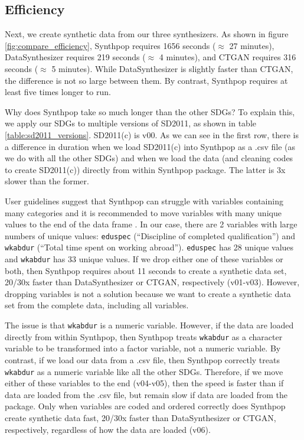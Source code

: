 \documentclass[runningheads]{llncs}
\begin{document}
\subsection{Efficiency}

Next, we create synthetic data from our three synthesizers.  As shown in figure \ref{fig:compare_efficiency}, Synthpop requires 1656 seconds ($\approx$ 27 minutes), DataSynthesizer requires 219 seconds ($\approx$ 4 minutes), and CTGAN requires 316 seconds ($\approx$ 5 minutes).  While DataSynthesizer is slightly faster than CTGAN, the difference is not so large between them.  By contrast, Synthpop requires at least five times longer to run. 

Why does Synthpop take so much longer than the other SDGs?  To explain this, we apply our SDGs to multiple versions of SD2011, as shown in table \ref{table:sd2011_versions}.  SD2011(c) is v00.  As we can see in the first row, there is a difference in duration when we load SD2011(c) into Synthpop as a .csv file (as we do with all the other SDGs) and when we load the data (and cleaning codes to create SD2011(c)) directly from within Synthpop package.  The latter is 3x slower than the former.   

User guidelines suggest that Synthpop can struggle with variables containing many categories and it is recommended to move variables with many unique values to the end of the data frame \cite{raab2017guidelines}.  In our case, there are 2 variables with large numbers of unique values: \texttt{eduspec} (``Discipline of completed qualification'') and \texttt{wkabdur} (``Total time spent on working abroad'').  \texttt{eduspec} has 28 unique values and \texttt{wkabdur} has 33 unique values.  If we drop either one of these variables or both, then Synthpop requires about 11 seconds to create a synthetic data set, 20/30x faster than DataSynthesizer or CTGAN, respectively (v01-v03).  However, dropping variables is not a solution because we want to create a synthetic data set from the complete data, including all variables.   

The issue is that \texttt{wkabdur} is a numeric variable.  However, if the data are loaded directly from within Synthpop, then Synthpop treats \texttt{wkabdur} as a character variable to be transformed into a factor variable, not a numeric variable.  By contrast, if we load our data from a .csv file, then Synthpop correctly treats  \texttt{wkabdur} as a numeric variable like all the other SDGs.  Therefore, if we move either of these variables to the end (v04-v05), then the speed is faster than if data are loaded from the .csv file, but remain slow if data are loaded from the package.  Only when variables are coded and ordered correctly does Synthpop create synthetic data fast, 20/30x faster than DataSynthesizer or CTGAN, respectively, regardless of how the data are loaded (v06).  
\end{document}

